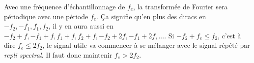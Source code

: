 \begin{solutionbox}{5cm}
    Avec une fréquence d'échantillonnage de $f_e$, la transformée de Fourier
    sera périodique avec une période $f_e$.
    Ça signifie qu'en plus des diracs en $-f_2, -f_1, f_1, f_2$,
    il y en aura aussi en $-f_2 + f, -f_1 + f, f_1 + f, f_2 + f, -f_2 + 2f, -f_1 + 2f, ...$.
    Si $-f_2 + f_e \le f_2$, c'est à dire $f_e \le 2f_2$, le signal utile va commencer à se mélanger avec le signal répété
    par \emph{repli spectral}.
    Il faut donc maintenir $f_e > 2f_2$.
\end{solutionbox}
